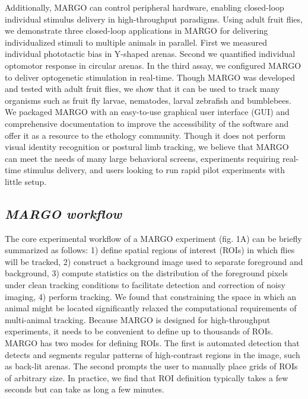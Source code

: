 \documentclass[12pt,letterpaper]{article}
\begin{document}
Additionally, MARGO can control peripheral hardware, enabling closed-loop individual stimulus delivery in high-throughput paradigms. Using adult fruit flies, we demonstrate three closed-loop \cite{heisenberg_wolf_1984} applications in MARGO for delivering individualized stimuli to multiple animals in parallel. First we measured individual phototactic bias in Y-shaped arenas. Second we quantified individual optomotor response in circular arenas. In the third assay, we configured MARGO to deliver optogenetic stimulation in real-time. Though MARGO was developed and tested with adult fruit flies, we show that it can be used to track many organisms such as fruit fly larvae, nematodes, larval zebrafish and bumblebees. We packaged MARGO with an easy-to-use graphical user interface (GUI) and comprehensive documentation to improve the accessibility of the software and offer it as a resource to the ethology community. Though it does not perform visual identity recognition or postural limb tracking, we believe that MARGO can meet the needs of many large behavioral screens, experiments requiring real-time stimulus delivery, and users looking to run rapid pilot experiments with little setup.

\subsection*{\textit{MARGO workflow}}

The core experimental workflow of a MARGO experiment (fig. 1A) can be briefly summarized as follows: 1) define spatial regions of interest (ROIs) in which flies will be tracked, 2) construct a background image used to separate foreground and background, 3) compute statistics on the distribution of the foreground pixels under clean tracking conditions to facilitate detection and correction of noisy imaging, 4) perform tracking. We found that constraining the space in which an animal might be located significantly relaxed the computational requirements of multi-animal tracking. Because MARGO is designed for high-throughput experiments, it needs to be convenient to define up to thousands of ROIs. MARGO has two modes for defining ROIs. The first is automated detection that detects and segments regular patterns of high-contrast regions in the image, such as back-lit arenas. The second prompts the user to manually place grids of ROIs of arbitrary size. In practice, we find that ROI definition typically takes a few seconds but can take as long a few minutes.
\end{document}
